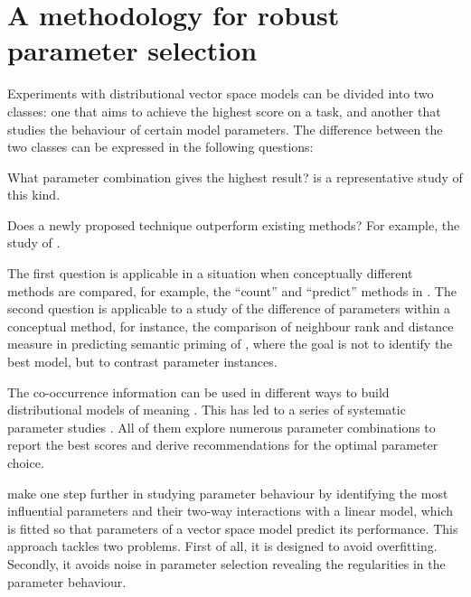 \chapter{A methodology for robust parameter selection}
\label{sec:methodology}

Experiments with distributional vector space models can be divided into two classes: one that aims to achieve the highest score on a task, and another that studies the behaviour of certain model parameters. The difference between the two classes can be expressed in the following questions:

\begin{compactitem}
\item What parameter combination gives the highest result?  is a representative study of this kind.
\item Does a newly proposed technique outperform existing methods? For example, the
  study of .
\end{compactitem}

The first question is applicable in a situation when conceptually different methods are compared, for example, the ``count'' and  ``predict'' methods in . The second question is applicable to a study of the difference of parameters within a conceptual method, for instance, the comparison of neighbour rank and distance measure in predicting semantic priming of , where the goal is not to identify the best model, but to contrast parameter instances.

The co-occurrence information can be used in different ways to build distributional models of meaning \cite{Turney:2010:FMV:1861751.1861756}. This has led to a series of  systematic parameter studies \cite{Bullinaria2007,BullinariaLevy2012,kiela-clark:2014:CVSC,lapesa2014large,TACL570}. All of them explore numerous parameter combinations to report the best scores and derive recommendations for the optimal parameter choice.

 make one step further in studying parameter behaviour by identifying the most influential parameters and their two-way interactions with a linear model, which is fitted so that parameters of a vector space model predict its performance. This approach tackles two problems. First of all, it is designed to avoid overfitting.\footnotemark{} Secondly, it avoids noise in parameter selection revealing the regularities in the parameter behaviour.

